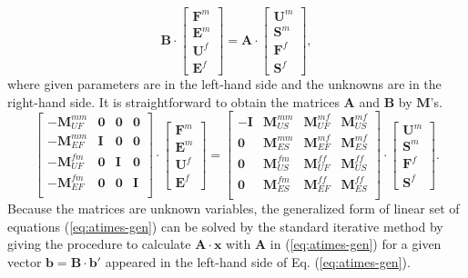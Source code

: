 \documentclass{book}
\begin{document}
\begin{equation}
  \bm{B}
  \cdot
  \left[
    \begin{array}{c}
      \bm{F}^{m}\\
      \bm{E}^{m}\\
      \bm{U}^{f}\\
      \bm{E}^{f}
    \end{array}
  \right]
  =
  \bm{A}
  \cdot
  \left[
    \begin{array}{c}
      \bm{U}^{m}\\
      \bm{S}^{m}\\
      \bm{F}^{f}\\
      \bm{S}^{f}
    \end{array}
  \right]
  ,
  \label{eq:atimes-gen}
\end{equation}
where given parameters are in the left-hand side
and the unknowns are in the right-hand side.
It is straightforward to obtain the matrices $\bm{A}$ and $\bm{B}$
by $\bm{M}$'s.
\begin{equation}
  \left[
    \begin{array}{cccc}
      -\bm{M}_{UF}^{mm} & \bm{0} & \bm{0} & \bm{0}\\
      -\bm{M}_{EF}^{mm} & \bm{I} & \bm{0} & \bm{0}\\
      -\bm{M}_{UF}^{fm} & \bm{0} & \bm{I} & \bm{0}\\
      -\bm{M}_{EF}^{fm} & \bm{0} & \bm{0} & \bm{I}\\
    \end{array}
  \right]
  \cdot
  \left[
    \begin{array}{c}
      \bm{F}^{m}\\
      \bm{E}^{m}\\
      \bm{U}^{f}\\
      \bm{E}^{f}
    \end{array}
  \right]
  =
  \left[
    \begin{array}{cccc}
      -\bm{I} & \bm{M}_{US}^{mm} & \bm{M}_{UF}^{mf} & \bm{M}_{US}^{mf}\\
      \bm{0}  & \bm{M}_{ES}^{mm} & \bm{M}_{EF}^{mf} & \bm{M}_{ES}^{mf}\\
      \bm{0}  & \bm{M}_{US}^{fm} & \bm{M}_{UF}^{ff} & \bm{M}_{US}^{ff}\\
      \bm{0}  & \bm{M}_{ES}^{fm} & \bm{M}_{EF}^{ff} & \bm{M}_{ES}^{ff}\\
    \end{array}
  \right]
  \cdot
  \left[
    \begin{array}{c}
      \bm{U}^{m}\\
      \bm{S}^{m}\\
      \bm{F}^{f}\\
      \bm{S}^{f}
    \end{array}
  \right]
  .
\end{equation}
Because the matrices are unknown variables,
the generalized form of linear set of equations (\ref{eq:atimes-gen})
can be solved by the standard iterative method
by giving the procedure to calculate $\bm{A}\cdot\bm{x}$
with $\bm{A}$ in (\ref{eq:atimes-gen})
for a given vector $\bm{b} = \bm{B}\cdot\bm{b}'$
appeared in the left-hand side of Eq. (\ref{eq:atimes-gen}).
\end{document}
